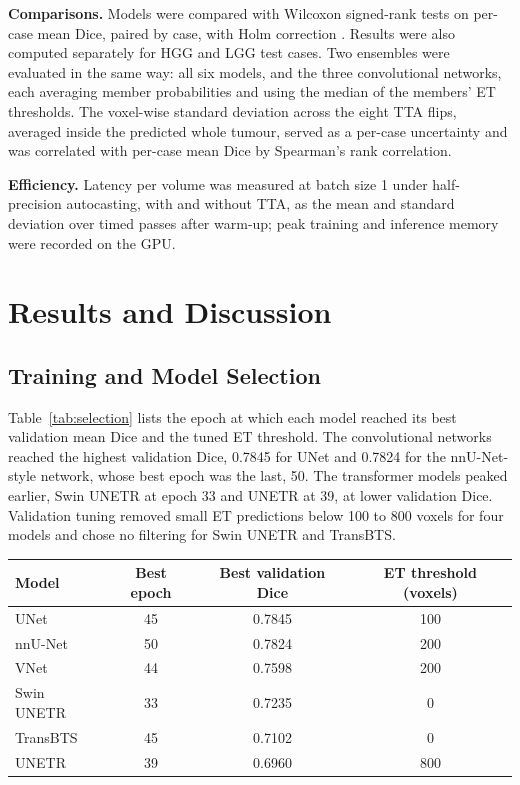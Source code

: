 \documentclass[a4paper,fleqn]{cas-sc}
\begin{document}
\textbf{Comparisons.} Models were compared with Wilcoxon signed-rank tests on per-case mean Dice, paired by case, with Holm correction \citep{holm1979}. Results were also computed separately for HGG and LGG test cases. Two ensembles were evaluated in the same way: all six models, and the three convolutional networks, each averaging member probabilities and using the median of the members' ET thresholds. The voxel-wise standard deviation across the eight TTA flips, averaged inside the predicted whole tumour, served as a per-case uncertainty and was correlated with per-case mean Dice by Spearman's rank correlation.

\textbf{Efficiency.} Latency per volume was measured at batch size 1 under half-precision autocasting, with and without TTA, as the mean and standard deviation over timed passes after warm-up; peak training and inference memory were recorded on the GPU.

\section{Results and Discussion}
\label{sec:results}

\subsection{Training and Model Selection}
\label{sec:selection}

Table~\ref{tab:selection} lists the epoch at which each model reached its best validation mean Dice and the tuned ET threshold. The convolutional networks reached the highest validation Dice, 0.7845 for UNet and 0.7824 for the nnU-Net-style network, whose best epoch was the last, 50. The transformer models peaked earlier, Swin UNETR at epoch 33 and UNETR at 39, at lower validation Dice. Validation tuning removed small ET predictions below 100 to 800 voxels for four models and chose no filtering for Swin UNETR and TransBTS.

\begin{heretable}
\centering
\caption{Model selection on the 56 validation cases.}
\label{tab:selection}
\small
\begin{tabular*}{\textwidth}{@{\extracolsep{\fill}}lccc@{}}
\toprule
Model & Best epoch & Best validation Dice & ET threshold (voxels) \\
\midrule
UNet & 45 & 0.7845 & 100 \\
nnU-Net & 50 & 0.7824 & 200 \\
VNet & 44 & 0.7598 & 200 \\
Swin UNETR & 33 & 0.7235 & 0 \\
TransBTS & 45 & 0.7102 & 0 \\
UNETR & 39 & 0.6960 & 800 \\
\bottomrule
\end{tabular*}
\end{heretable}
\end{document}
